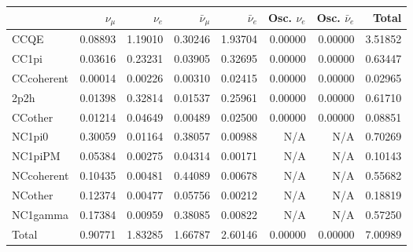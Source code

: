 \begin{tabular} { | l ||r | r | r | r | r | r | | r | }
\hline
              & $\nu_\mu$            & $\nu_e$              & $\bar{\nu}_{\mu}$    & $\bar{\nu}_{e}$      & Osc. $\nu_e$         & Osc. $\bar{\nu}_{e}$ & Total                \\ \hline\hline
 CCQE         & 0.08893              & 1.19010              & 0.30246              & 1.93704              & 0.00000              & 0.00000              & 3.51852              \\ \hline
 CC1pi        & 0.03616              & 0.23231              & 0.03905              & 0.32695              & 0.00000              & 0.00000              & 0.63447              \\ \hline
 CCcoherent   & 0.00014              & 0.00226              & 0.00310              & 0.02415              & 0.00000              & 0.00000              & 0.02965              \\ \hline
 2p2h         & 0.01398              & 0.32814              & 0.01537              & 0.25961              & 0.00000              & 0.00000              & 0.61710              \\ \hline
 CCother      & 0.01214              & 0.04649              & 0.00489              & 0.02500              & 0.00000              & 0.00000              & 0.08851              \\ \hline
 NC1pi0       & 0.30059              & 0.01164              & 0.38057              & 0.00988              & N/A                  & N/A                  & 0.70269              \\ \hline
 NC1piPM      & 0.05384              & 0.00275              & 0.04314              & 0.00171              & N/A                  & N/A                  & 0.10143              \\ \hline
 NCcoherent   & 0.10435              & 0.00481              & 0.44089              & 0.00678              & N/A                  & N/A                  & 0.55682              \\ \hline
 NCother      & 0.12374              & 0.00477              & 0.05756              & 0.00212              & N/A                  & N/A                  & 0.18819              \\ \hline
 NC1gamma     & 0.17384              & 0.00959              & 0.38085              & 0.00822              & N/A                  & N/A                  & 0.57250              \\ \hline
\hline
 Total        & 0.90771              & 1.83285              & 1.66787              & 2.60146              & 0.00000              & 0.00000              & 7.00989              \\ \hline

\end{tabular}
